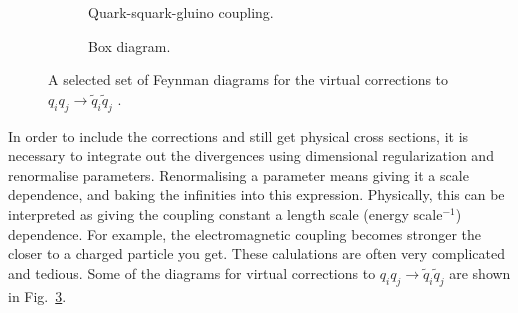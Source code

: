 \documentclass[twoside,english]{uiofysmaster}
\begin{document}
{\begin{figure}
\begin{subfigure}[b]{0.8\textwidth}
\caption{Quark-squark-gluino coupling.}
\label{fig:tiger}
\end{subfigure}
\begin{subfigure}[b]{0.8\textwidth}
\centering
{}
        \caption{Box diagram.}
        \label{fig:mouse}
    \end{subfigure}
    \caption{A selected set of Feynman diagrams for the virtual corrections to $q_iq_j \rightarrow \widetilde{q}_i \widetilde{q}_j$ \cite{beenakker1997squark}.}
\label{Fig:: hadron susy : virtual correction Feynman diagrams}
\end{figure}



In order to include the corrections and still get physical cross sections, it is necessary to integrate out the divergences using dimensional regularization and renormalise parameters. Renormalising a parameter means giving it a scale dependence, and baking the infinities into this expression. Physically, this can be interpreted as giving the coupling constant a length scale (energy scale$^{-1}$) dependence. For example, the electromagnetic coupling becomes stronger the closer to a charged particle you get. These calulations are often very complicated and tedious. Some of the diagrams for virtual corrections to $q_iq_j \rightarrow \widetilde{q}_i \widetilde{q}_j$ are shown in Fig.~\ref{Fig:: hadron susy : virtual correction Feynman diagrams}.

}
\end{document}
